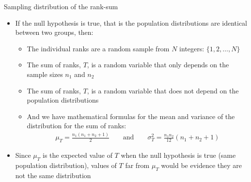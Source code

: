 \documentclass[xcolor=dvipsnames]{beamer}
\begin{document}
\begin{frame}{Sampling distribution of the rank-sum}
	\begin{itemize}
		\item If the null hypothesis is true, that is the population distributions are identical between two groups, then: \pause
		\begin{itemize}
			\item The individual ranks are a random sample from $N$ integers: $\{1, 2, \hdots, N\}$ \pause
			\item The sum of ranks, $T$, is a random variable that only depends on the sample sizes $n_1$ and $n_2$ \pause
			\item The sum of ranks, $T$, is a random variable that does not depend on the population distributions \pause
			\item And we have mathematical formulas for the mean and variance of the distribution for the sum of ranks: \pause
			\begin{gather*}
			\mu_T = \frac{n_1 (n_1 + n_2 + 1)}{2} \quad \quad \text{and} \quad \quad \sigma_T^{2} = \frac{n_1 n_2}{12}(n_1 +n_2 +1)
			\end{gather*}\pause
		\end{itemize}
	\item Since $\mu_T$ is the expected value of $T$ when the null hypothesis is true (same population distribution), values of $T$ far from $\mu_T$ would be evidence they are not the same distribution
	\end{itemize}
\end{frame}
\end{document}
